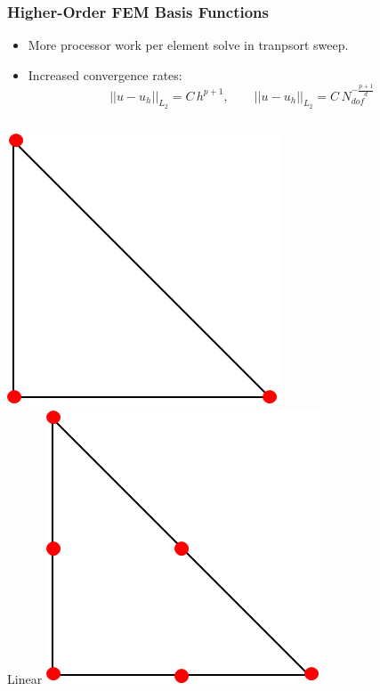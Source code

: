 \documentclass[compress,10pt]{beamer}
\begin{document}
\begin{frame}[t]\frametitle{Higher-Order FEM Basis Functions}
\begin{block}{}
\begin{itemize}
\item <1-> More processor work per element solve in tranpsort sweep.
\item <2-> Increased convergence rates:
{
\begin{equation*}
|| u - u_h ||_{L_2} = C \, h^{p+1}, \qquad || u - u_h ||_{L_2} = C \, N_{dof}^{-\frac{p+1}{d}}
\end{equation*}
}
\end{itemize}
\end{block}
\centering
{}
{
\vspace{3mm}
\centering
\begin{columns}
\centering
{}\includegraphics[width=0.75\columnwidth]{images/ref_tri_dofs_k1.png}\\
Linear
\centering
{}\includegraphics[width=0.75\columnwidth]{images/ref_tri_dofs_k2.png} \\

\end{columns}}
\end{frame}
\end{document}
